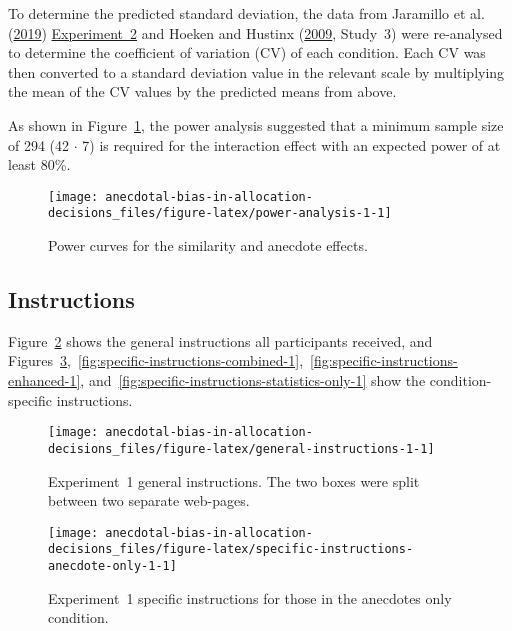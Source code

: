 \documentclass[
  man, donotrepeattitle,floatsintext]{apa7}
\theoremstyle{definition}
\theoremstyle{definition}
\theoremstyle{definition}
\theoremstyle{definition}
\theoremstyle{remark}
\begin{document}
To determine the predicted standard deviation, the data from Jaramillo et al. (\protect\hyperlink{ref-jaramillo2019}{2019}) \protect\hyperlink{experiment-2}{Experiment~2} and Hoeken and Hustinx (\protect\hyperlink{ref-hoeken2009}{2009}, Study~3) were re-analysed to determine the
coefficient of variation (CV) of each condition. Each CV was then converted to a
standard deviation value in the relevant scale by multiplying the mean of the CV
values by the predicted means from above.

As shown in Figure~\ref{fig:power-analysis-1}, the power analysis
suggested that a minimum sample size of 294
(42 \(\cdot\) 7) is required for the interaction effect with
an expected power of at least 80\%.



\begin{figure}
\texttt{[image: anecdotal-bias-in-allocation-decisions\_files/figure-latex/power-analysis-1-1]} \caption{Power curves for the similarity and anecdote effects.}\label{fig:power-analysis-1}
\end{figure}

\hypertarget{instructions-materials-1-appendix}{%
\subsection{Instructions}\label{instructions-materials-1-appendix}}

Figure~\ref{fig:general-instructions-1} shows the general
instructions all participants received, and
Figures~\ref{fig:specific-instructions-anecdote-only-1},~\ref{fig:specific-instructions-combined-1},~\ref{fig:specific-instructions-enhanced-1},
and~\ref{fig:specific-instructions-statistics-only-1} show
the condition-specific instructions.



\begin{figure}
\texttt{[image: anecdotal-bias-in-allocation-decisions\_files/figure-latex/general-instructions-1-1]} \caption{Experiment~1 general instructions. The two boxes were split between two separate web-pages.}\label{fig:general-instructions-1}
\end{figure}



\begin{figure}
\texttt{[image: anecdotal-bias-in-allocation-decisions\_files/figure-latex/specific-instructions-anecdote-only-1-1]} \caption{Experiment~1 specific instructions for those in the anecdotes only condition.}\label{fig:specific-instructions-anecdote-only-1}
\end{figure}
\end{document}
